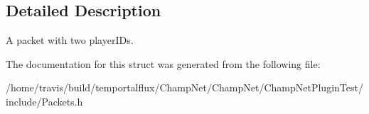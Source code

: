 \subsection{Detailed Description}
A packet with two player\-I\-Ds. 

The documentation for this struct was generated from the following file\-:\begin{DoxyCompactItemize}
\item 
/home/travis/build/temportalflux/\-Champ\-Net/\-Champ\-Net/\-Champ\-Net\-Plugin\-Test/include/Packets.\-h\end{DoxyCompactItemize}
